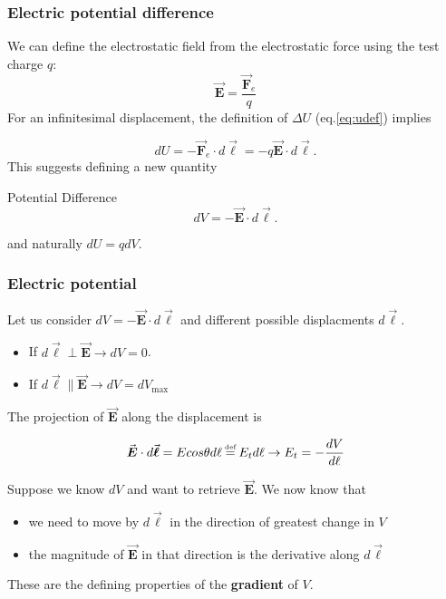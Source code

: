 \documentclass{beamer}
\newcommand{\vc}[1]{\vec{\boldsymbol{#1}}}
\newcommand\deq{\stackrel{\mathclap{\tiny\mbox{def}}}{=}}
\begin{document}
\begin{frame}

\frametitle{Electric potential difference}
\small 
We can define the electrostatic field from the electrostatic force  using the test charge $q$:
\begin{equation}
	\vc{E}= \dfrac{\vc{F}_e}{q}
\end{equation}
For an infinitesimal displacement, the definition of $\Delta U$ (eq.\ref{eq:udef}) implies

\begin{equation}
	dU = - \vc{F}_e\cdot d\vc{\ell}= -q\vc{E}\cdot d\vc{\ell}.
\end{equation}
This suggests defining a new quantity
\begin{block}{Potential Difference}
\begin{equation}
	dV = -\vc{E}\cdot d\vc{\ell}.
\end{equation}
\end{block}
and naturally $dU = q dV$.

\end{frame}




\begin{frame}
\frametitle{Electric potential}
\small

Let us consider $dV = -\vc{E}\cdot d\vc{\ell}$ and different possible displacments $d\vc{\ell}$.

\begin{itemize}
	\item If $d\vc{\ell}\perp\vc{E}\rightarrow dV=0$.
	\item If $d\vc{\ell}\parallel \vc{E}\rightarrow dV=dV_{\text{max}}$
\end{itemize}
The projection of $\vc{E}$ along the displacement is 

\begin{equation} \vc{E}\cdot d\vc{\ell}= E cos\theta d\ell \deq E_t d\ell \rightarrow E_t = -\dfrac{dV}{d\ell}
\end{equation}

Suppose we know $dV$ and want to retrieve $\vc{E}$. We now know that
\begin{itemize}
	\item we need to move by $d\vc{\ell}$ in the direction of greatest change in $V$
	\item the magnitude of $\vc{E}$ in that direction is the derivative along $d\vc{\ell}$
\end{itemize}
These are the defining properties of the \textbf{gradient} of $V$.



\end{frame}%
\end{document}
